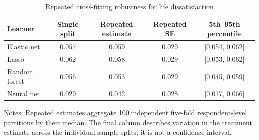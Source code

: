 \begin{table}[!htbp]
\centering
\caption{Repeated cross-fitting robustness for life dissatisfaction}
\label{tab:robustness_repeated_cross_fitting}
\small
\setlength{\tabcolsep}{5pt}
\begin{tabular}{lcccc}
\hline
Learner & Single split & Repeated estimate & Repeated SE & 5th--95th percentile
\\
\hline
Elastic net & 0.057 & 0.059 & 0.029 & [0.054, 0.062]
\\
Lasso & 0.062 & 0.058 & 0.029 & [0.053, 0.062]
\\
Random forest & 0.056 & 0.053 & 0.029 & [0.045, 0.059]
\\
Neural net & 0.029 & 0.042 & 0.028 & [0.017, 0.066]
\\
\hline
\end{tabular}
\begin{minipage}{0.96\textwidth}
\footnotesize Notes: Repeated estimates aggregate 100 independent five-fold respondent-level partitions by their median. The final column describes variation in the treatment estimate across the individual sample splits; it is not a confidence interval.
\end{minipage}
\end{table}
